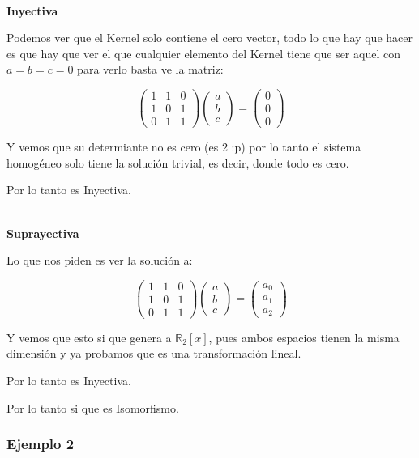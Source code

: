 \documentclass[12pt]{report}                                    %
\newcommand{\pVector}[1]{                                       %
        \ensuremath{\begin{pmatrix}#1\end{pmatrix}}                 %
    }
\begin{document}
            \textbf{\\Inyectiva}

            Podemos ver que el Kernel solo contiene el cero vector, todo lo que hay que hacer es
            que hay que ver el que cualquier elemento del Kernel tiene que ser aquel con $a=b=c=0$
            para verlo basta ve la matriz:

            \begin{equation*}
                \pVector{1&1&0\\1&0&1\\0&1&1} \pVector{a\\b\\c} = \pVector{0\\0\\0}
            \end{equation*}

            Y vemos que su determiante no es cero (es 2 :p) por lo tanto el sistema homogéneo solo
            tiene la solución trivial, es decir, donde todo es cero.

            Por lo tanto es Inyectiva.

            \textbf{\\Suprayectiva}

            Lo que nos piden es ver la solución a:

            \begin{equation*}
                \pVector{1&1&0\\1&0&1\\0&1&1} \pVector{a\\b\\c} = \pVector{a_0\\a_1\\a_2}
            \end{equation*}

            Y vemos que esto si que genera a $\mathbb{R}_2[x]$, pues ambos espacios tienen la misma dimensión
            y ya probamos que es una transformación lineal.

            Por lo tanto es Inyectiva.  

            Por lo tanto si que es Isomorfismo.   


            \clearpage
            \subsubsection{\large Ejemplo 2}
\end{document}
